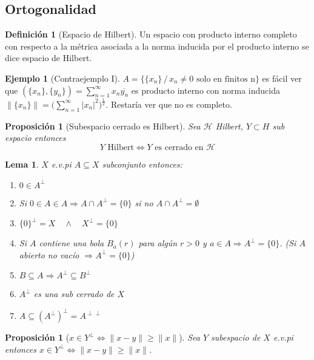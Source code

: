 \documentclass[12pt,a4paper]{article}
\newtheorem{lemma}[theorem]{Lema}
\newtheorem{proposition}[theorem]{Proposición}
\theoremstyle{definition}
\newtheorem{definition}[theorem]{Definición}
\newtheorem{example}[theorem]{Ejemplo}
\theoremstyle{remark}
\begin{document}
\subsection{Ortogonalidad}

\begin{definition}[Espacio de Hilbert]
Un espacio con producto interno completo con respecto a la métrica asociada a la norma inducida por el producto interno se dice espacio de Hilbert.
\end{definition}

\begin{example}[Contraejemplo I]
$A =\{\{x_n\} \,/\, x_n\neq 0 \text{ solo en finitos n}\}$ es fácil ver que $(\{x_n\},\{y_n\})=\sum^{\infty}_{n=1}x_n\overline{y_n}$ es producto interno con norma inducida $\|\{x_n\}\|=\big(\sum^{\infty}_{n=1}|x_n|^2\big)^{\frac{1}{2}}$. Restaría ver que no es completo.
\end{example}

\begin{proposition}[Subespacio cerrado es Hilbert]
Sea $\mathcal{H}$ Hilbert, $Y\subset H$ sub espacio entonces 
$$Y \text{ Hilbert}\iff Y \text{ es cerrado en }\mathcal{H}$$
\end{proposition}

\begin{lemma}
$X$ e.v.pi $A\subseteq X$ subconjunto entonces:
\begin{enumerate}
    \item $0\in A^{\perp}$
    \item Si $0\in A \in A\Rightarrow A \cap A^{\perp} = \{0\}$ si no $A\cap A^{\perp} = \emptyset$
    \item $\{0\}^{\perp}=X \quad\land\quad X^{\perp}=\{0\}$
    \item Si $A$ contiene una bola $B_a(r)$ para algún $r>0$ y $a\in A\Rightarrow A^{\perp}=\{0\}$. (Si $A$ abierto no vacío $\Rightarrow A^{\perp}=\{0\}$)
    \item $B\subseteq A\Rightarrow A^{\perp}\subseteq B^{\perp}$
    \item $A^{\perp}$ es una sub cerrado de $X$
    \item $A\subseteq (A^{\perp})^{\perp}=A^{\perp\perp}$
\end{enumerate}
\end{lemma}

\begin{proposition}[$x\in Y^{\perp} \iff \|x-y\|\geq \|x\|$]
Sea $Y$ subespacio de $X$ e.v.pi entonces $x\in Y^{\perp} \iff \|x-y\|\geq \|x\|$.
\end{proposition}
\end{document}
